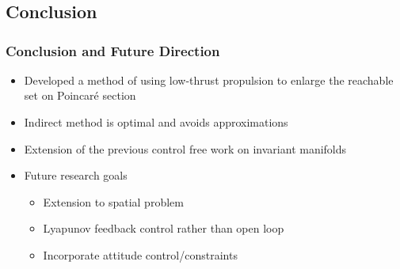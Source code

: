 
\section*{}
\subsection*{Conclusion}
\begin{frame} %
\frametitle{Conclusion and Future Direction}
  \begin{itemize}
  \item Developed a method of using low-thrust propulsion to enlarge the reachable set on Poincar\'e section 
  \item Indirect method is optimal and avoids approximations 
  \item Extension of the previous control free work on invariant manifolds
  \item Future research goals
  	\begin{itemize} 
	  \item Extension to spatial problem 
	  \item Lyapunov feedback control rather than open loop 
	  \item Incorporate attitude control/constraints 
	\end{itemize}
   \end{itemize}
\end{frame}   %

